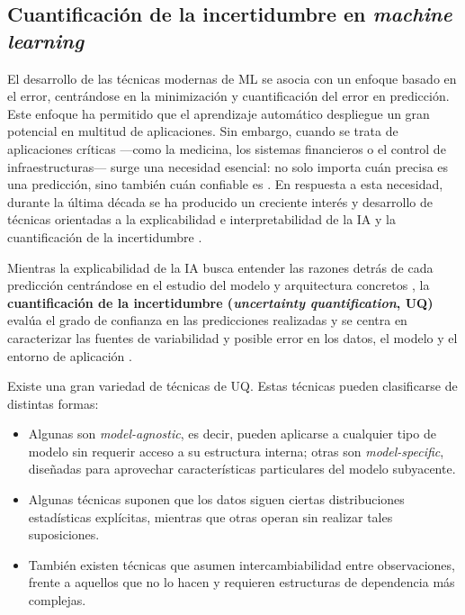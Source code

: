 
\subsection{Cuantificación de la incertidumbre en \textit{machine learning}} 

El desarrollo de las técnicas modernas de \acrshort{ML} se asocia con un enfoque basado en el error, centrándose en la minimización y cuantificación del error en predicción. Este enfoque ha permitido que el aprendizaje automático despliegue un gran potencial en multitud de aplicaciones. Sin embargo, cuando se trata de aplicaciones críticas ---como la medicina, los sistemas financieros o el control de infraestructuras--- surge una necesidad esencial: no solo importa cuán precisa es una predicción, sino también cuán confiable es \cite{begoli2019}. En respuesta a esta necesidad, durante la última década se ha producido un creciente interés y desarrollo de técnicas orientadas a la explicabilidad e interpretabilidad de la \acrshort{IA} \cite{angelov2021, ali2023, miller2019, loh2022} y la cuantificación de la incertidumbre \cite{abdar2021, psaros2023, nemani2023}.

Mientras la explicabilidad de la \acrshort{IA} busca entender las razones detrás de cada predicción centrándose en el estudio del modelo y arquitectura concretos \cite{salvi2025}, la \textbf{cuantificación de la incertidumbre (\textit{uncertainty quantification}, \acrshort{UQ})} evalúa el grado de confianza en las predicciones realizadas y se centra en caracterizar las fuentes de variabilidad y posible error en los datos, el modelo y el entorno de aplicación \cite{nemani2023}.

Existe una gran variedad de técnicas de \acrshort{UQ}. Estas técnicas pueden clasificarse de distintas formas: 

\begin{itemize}

    \item Algunas son \textit{model-agnostic}, es decir, pueden aplicarse a cualquier tipo de modelo sin 
    requerir acceso a su estructura interna; otras son \textit{model-specific}, diseñadas para aprovechar 
    características particulares del modelo subyacente. 

    \item Algunas técnicas suponen que los datos siguen ciertas distribuciones estadísticas explícitas, 
    mientras que otras operan sin realizar tales suposiciones.

    \item También existen técnicas que asumen intercambiabilidad entre observaciones, frente a aquellos que 
    no lo hacen y requieren estructuras de dependencia más complejas. 

\end{itemize} 


